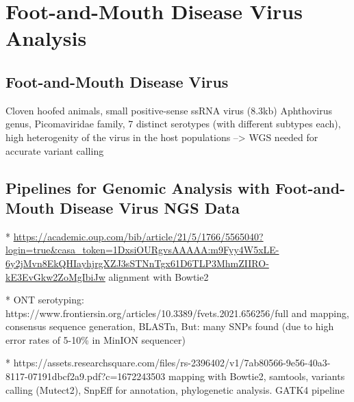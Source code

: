 \section{Foot-and-Mouth Disease Virus Analysis}
\subsection{Foot-and-Mouth Disease Virus}
Cloven hoofed animals,
small positive-sense ssRNA virus (8.3kb)
Aphthovirus genus, Picomaviridae family, 7 distinct serotypes (with different subtypes each),
high heterogenity of the virus in the host populations --> \ac{WGS}  needed for accurate variant calling

\subsection{Pipelines for Genomic Analysis with Foot-and-Mouth Disease Virus NGS Data}
* \url{https://academic.oup.com/bib/article/21/5/1766/5565040?login=true&casa_token=1DxsiOURgvsAAAAA:m9Fyy4W5xLE-6y2jMvn8EkQHIayhjrgXZJ3sSTNnTgx61D6TLP3MhmZIIRO-kE3EvGkw2ZoMgIbiJw} alignment with Bowtie2

* \ac{ONT} serotyping: https://www.frontiersin.org/articles/10.3389/fvets.2021.656256/full and mapping, consensus sequence generation, BLASTn, But: many SNPs found (due to high error rates of 5-10\% in MinION sequencer)

* https://assets.researchsquare.com/files/rs-2396402/v1/7ab80566-9e56-40a3-8117-07191dbcf2a9.pdf?c=1672243503 mapping with Bowtie2, samtools, variants calling (Mutect2), SnpEff for annotation, phylogenetic analysis. GATK4 pipeline


